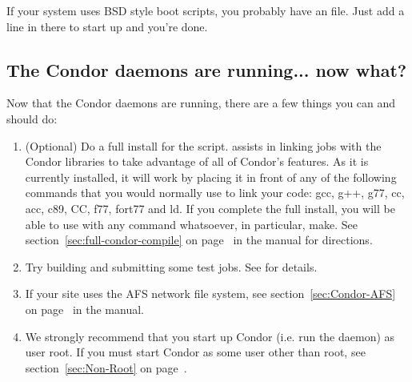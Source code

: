 If your system uses BSD style boot scripts, you probably have an
 file.  Just add a line in there to start up
 and you're done.


\subsection{The Condor daemons are running... now what?}

Now that the Condor daemons are running, there are a few things you
can and should do:

\begin{enumerate}
\item (Optional) Do a full install for the  script.
     assists in linking jobs with the Condor libraries
    to take advantage of all of Condor's features.  As it is currently
    installed, it will work by placing it in front of any of the
    following commands that you would normally use to link your code:
    gcc, g++, g77, cc, acc, c89, CC, f77, fort77 and ld.  If you
    complete the full install, you will be able to use
     with any command whatsoever, in particular, make.
    See section~\ref{sec:full-condor-compile} on
    page~\pageref{sec:full-condor-compile} in the manual for
    directions.

\item Try building and submitting some test jobs.  See
     for details.

\item If your site uses the AFS network file system, see
section~\ref{sec:Condor-AFS} on page~\pageref{sec:Condor-AFS} in the
manual.

\item We strongly recommend that you start up Condor (i.e. run the
 daemon) as user root.  If you must start Condor as
some user other than root, see section~\ref{sec:Non-Root} on
page~\pageref{sec:Non-Root}.

\end{enumerate}

